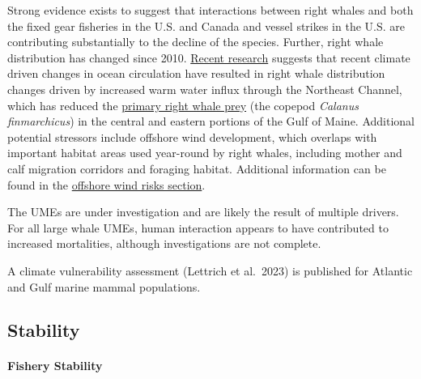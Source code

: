 \documentclass[
  10pt,
]{article}
\begin{document}
Strong evidence exists to suggest that interactions between right whales and both the fixed gear fisheries in the U.S. and Canada and vessel strikes in the U.S. are contributing substantially to the decline of the species. Further, right whale distribution has changed since 2010. \href{https://noaa-edab.github.io/catalog/narw.html}{Recent research} suggests that recent climate driven changes in ocean circulation have resulted in right whale distribution changes driven by increased warm water influx through the Northeast Channel, which has reduced the \href{https://noaa-edab.github.io/catalog/zoo_energy.html}{primary right whale prey} (the copepod \emph{Calanus finmarchicus}) in the central and eastern portions of the Gulf of Maine. Additional potential stressors include offshore wind development, which overlaps with important habitat areas used year-round by right whales, including mother and calf migration corridors and foraging habitat. Additional information can be found in the \hyperref[other-ocean-uses-offshore-wind]{offshore wind risks section}.

The UMEs are under investigation and are likely the result of multiple drivers. For all large whale UMEs, human interaction appears to have contributed to increased mortalities, although investigations are not complete.

A climate vulnerability assessment (Lettrich et al.~2023) is published for Atlantic and Gulf marine mammal populations.

\newpage

\subsection{Stability}\label{stability}

\paragraph{Fishery Stability}\label{fishery-stability}
\end{document}
